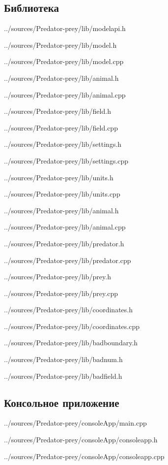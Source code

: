 \documentclass[a4paper]{article}
\begin{document}
\subsection{Библиотека}

{../sources/Predator-prey/lib/modelapi.h}
\newpage


{../sources/Predator-prey/lib/model.h}

{../sources/Predator-prey/lib/model.cpp}
\newpage


{../sources/Predator-prey/lib/animal.h}

{../sources/Predator-prey/lib/animal.cpp}
\newpage


{../sources/Predator-prey/lib/field.h}

{../sources/Predator-prey/lib/field.cpp}
\newpage


{../sources/Predator-prey/lib/settings.h}

{../sources/Predator-prey/lib/settings.cpp}
\newpage


{../sources/Predator-prey/lib/units.h}

{../sources/Predator-prey/lib/units.cpp}
\newpage


{../sources/Predator-prey/lib/animal.h}

{../sources/Predator-prey/lib/animal.cpp}
\newpage


{../sources/Predator-prey/lib/predator.h}

{../sources/Predator-prey/lib/predator.cpp}
\newpage


{../sources/Predator-prey/lib/prey.h}

{../sources/Predator-prey/lib/prey.cpp}
\newpage


{../sources/Predator-prey/lib/coordinates.h}

{../sources/Predator-prey/lib/coordinates.cpp}
\newpage


{../sources/Predator-prey/lib/badboundary.h}

{../sources/Predator-prey/lib/badnum.h}

{../sources/Predator-prey/lib/badfield.h}
\newpage

\subsection{Консольное приложение}


{../sources/Predator-prey/consoleApp/main.cpp}
\newpage


{../sources/Predator-prey/consoleApp/consoleapp.h}

{../sources/Predator-prey/consoleApp/consoleapp.cpp}
\newpage
\end{document}
